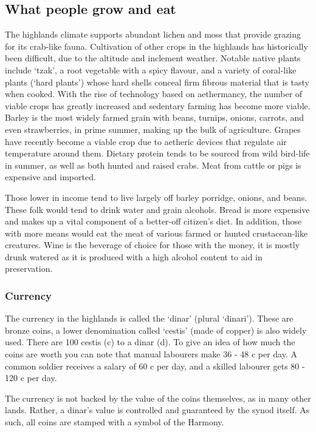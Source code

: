 \documentclass[a4paper,11pt,oneside]{book}
\begin{document}
\subsection{What people grow and eat}
The highlands climate supports abundant lichen and moss that provide grazing for its crab-like fauna. Cultivation of other crops in the highlands has historically been difficult, due to the altitude and inclement weather. Notable native plants include `tzak', a root vegetable with a spicy flavour, and a variety of coral-like plants (`hard plants') whose hard shells conceal firm fibrous material that is tasty when cooked. With the rise of technology based on aethermancy, the number of viable crops has greatly increased and sedentary farming has become more viable. Barley is the most widely farmed grain with beans, turnips, onions, carrots, and even strawberries, in prime summer, making up the bulk of agriculture. Grapes have recently become a viable crop due to aetheric devices that regulate air temperature around them. Dietary protein tends to be sourced from wild bird-life in summer, as well as both hunted and raised crabs. Meat from cattle or pigs is expensive and imported. 

Those lower in income tend to live largely off barley porridge, onions, and beans. These folk would tend to drink water and grain alcohols. Bread is more expensive and makes up a vital component of a better-off citizen's diet. In addition, those with more means would eat the meat of various farmed or hunted crustacean-like creatures. Wine is the beverage of choice for those with the money, it is mostly drunk watered as it is produced with a high alcohol content to aid in preservation.   

\subsubsection{Currency}
The currency in the highlands is called the `dinar' (plural `dinari'). These are bronze coins, a lower denomination called `cestis' (made of copper) is also widely used. There are 100 cestis (c) to a dinar (d). To give an idea of how much the coins are worth you can note that manual labourers make 36 - 48 c per day. A common soldier receives a salary of 60 c per day, and a skilled labourer gets 80 - 120 c per day. 

The currency is not backed by the value of the coins themselves, as in many other lands. Rather, a dinar's value is controlled and guaranteed by the synod itself. As such, all coins are stamped with a symbol of the Harmony. 
\end{document}
